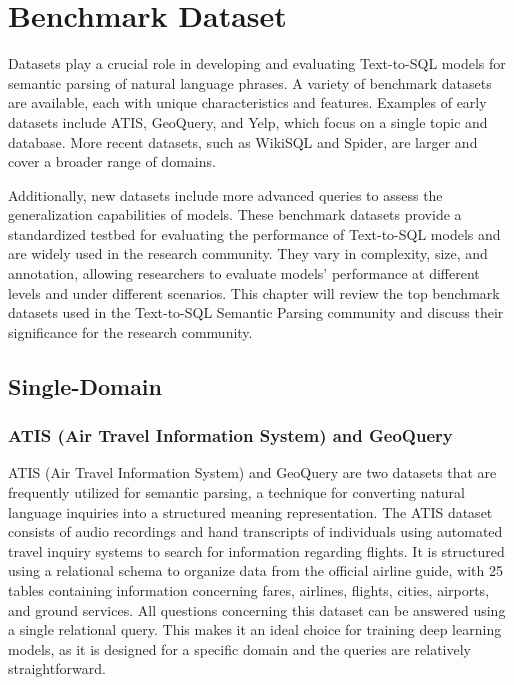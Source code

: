 \section{Benchmark Dataset}

Datasets play a crucial role in developing and evaluating Text-to-SQL models for semantic parsing of natural language phrases. A variety of benchmark datasets are available, each with unique characteristics and features. Examples of early datasets include ATIS\cite{dahl-etal-1994-expanding}, GeoQuery\cite{10.1007/3-540-44795-4_40}, and Yelp\cite{10.1145/3133887}, which focus on a single topic and database. More recent datasets, such as WikiSQL\cite{zhong_seq2sql_2017} and Spider\cite{yu_spider_2019}, are larger and cover a broader range of domains.

Additionally, new datasets include more advanced queries to assess the generalization capabilities of models. These benchmark datasets provide a standardized testbed for evaluating the performance of Text-to-SQL models and are widely used in the research community. They vary in complexity, size, and annotation, allowing researchers to evaluate models' performance at different levels and under different scenarios. This chapter will review the top benchmark datasets used in the Text-to-SQL Semantic Parsing community and discuss their significance for the research community.

\subsection{Single-Domain}

\subsubsection{ATIS (Air Travel Information System) and GeoQuery}

ATIS (Air Travel Information System)\cite{dahl-etal-1994-expanding} and GeoQuery\cite{10.1007/3-540-44795-4_40} are two datasets that are frequently utilized for semantic parsing, a technique for converting natural language inquiries into a structured meaning representation. The ATIS dataset consists of audio recordings and hand transcripts of individuals using automated travel inquiry systems to search for information regarding flights. It is structured using a relational schema to organize data from the official airline guide, with 25 tables containing information concerning fares, airlines, flights, cities, airports, and ground services.
All questions concerning this dataset can be answered using a single relational query. This makes it an ideal choice for training deep learning models, as it is designed for a specific domain and the queries are relatively straightforward.

